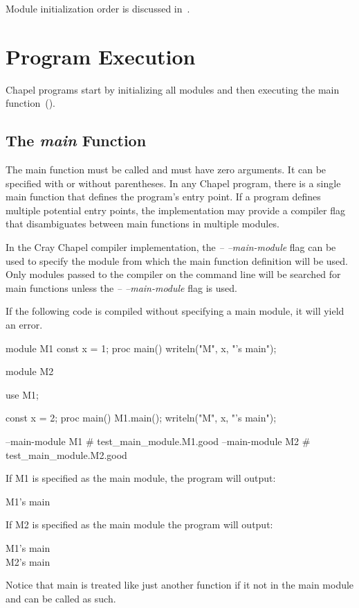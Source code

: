Module initialization order is discussed
in~.


\section{Program Execution}
\label{Program_Execution}

Chapel programs start by initializing all modules and then executing
the main function~().

\subsection{The {\em main} Function}
\label{The_main_Function}

The main function must be called  and must have zero
arguments.  It can be specified with or without parentheses.  In any
Chapel program, there is a single main function that defines the
program's entry point.  If a program defines multiple potential entry
points, the implementation may provide a compiler flag that
disambiguates between main functions in multiple modules.

\begin{craychapel}
In the Cray Chapel compiler implementation, the \emph{--
--main-module} flag can be used to specify the module from which the
main function definition will be used.  Only modules passed to the
compiler on the command line will be searched for main functions
unless the \emph{-- --main-module} flag is used.
\end{craychapel}

\begin{example}
If the following code is compiled without specifying a main module, it
will yield an error.
\begin{chapelpre}
\end{chapelpre}
\begin{chapel}
module M1 {
  const x = 1;
  proc main() {
    writeln("M", x, "'s main");
  }
}
 
module M2 {
  use M1;

  const x = 2;
  proc main() {
    M1.main();
    writeln("M", x, "'s main");
  }
}
\end{chapel}
\begin{chapelcompopts}
--main-module M1 \# test\_main\_module.M1.good
--main-module M2 \# test\_main\_module.M2.good
\end{chapelcompopts}
If M1 is specified as the main module, the program will output:
\begin{chapelprintoutput}
M1's main
\end{chapelprintoutput}
If M2 is specified as the main module the program will output:
\begin{chapelprintoutput}
M1's main\\
M2's main
\end{chapelprintoutput}
Notice that main is treated like just another function if it not in
the main module and can be called as such.
\end{example}

